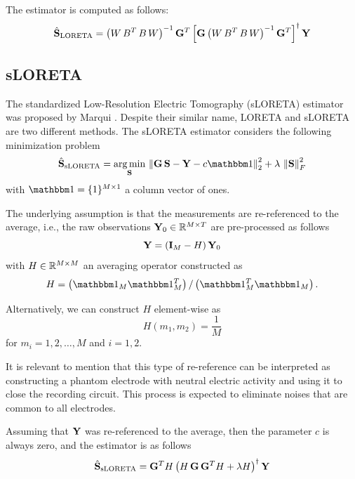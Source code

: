 The estimator is computed as follows:
\begin{equation}
\hat{\mathbf{S}}_\text{LORETA} 
= 
\left(  W\, B^T\, B\, W  \right)^{-1}
\mathbf{G}^T
\left[  \mathbf{G} \left(  W\, B^T\, B\, W  \right)^{-1} \mathbf{G}^T  \right]^\dagger
\mathbf{Y}
\label{est:LORETA}
\end{equation}

\subsection{sLORETA}

The standardized Low-Resolution Electric Tomography (sLORETA) estimator was proposed by Marqui \cite{sloreta}.
%
Despite their similar name, LORETA and sLORETA are two different methods.
%
The sLORETA estimator considers the following minimization problem
\begin{equation}
\hat{\SA}_\text{sLORETA} 
= 
\argmin_{\SA}\, \nnorm{\G\, \SA - \Y - c \ones }_2^2 + \lambda\, \nnorm{\SA}_F^2
\end{equation}
with $\ones=\{1\}^{M\times 1}$ a column vector of ones.

The underlying assumption is that the measurements are re-referenced to the average, i.e., the raw observations $\mathbf{Y}_0\in \mathbb{R}^{M\times T}$ are pre-processed as follows
\begin{equation}
\mathbf{Y} = \left(  \mathbf{I}_M - H  \right) \mathbf{Y}_0
\end{equation}
with $H \in \mathbb{R}^{M \times M}$ an averaging operator constructed as
\begin{equation}
H = \ppar{\ones_M \ones_M\trans}/\ppar{\ones_M\trans \ones_M}.
\end{equation}

Alternatively, we can construct $H$ element-wise as
\begin{equation}
    H(m_1, m_2) = \frac{1}{M}
\end{equation}
for $m_i = 1, 2, \dots, M$ and $i=1,2$.

It is relevant to mention that this type of re-reference can be interpreted as constructing a phantom electrode with neutral electric activity and using it to close the recording circuit.
%
This process is expected to eliminate noises that are common to all electrodes.

Assuming that $\mathbf{Y}$ was re-referenced to the average, then the parameter $c$ is always zero, and the estimator is as follows
\begin{equation}
\hat{\mathbf{S}}_{\text{sLORETA}} =
\mathbf{G}^T H 
\left( 
H\, \mathbf{G} \,\mathbf{G}^T 
H + 
\lambda H
 \right)^\dagger
\mathbf{Y}
\label{est:sLORETA}
\end{equation}

